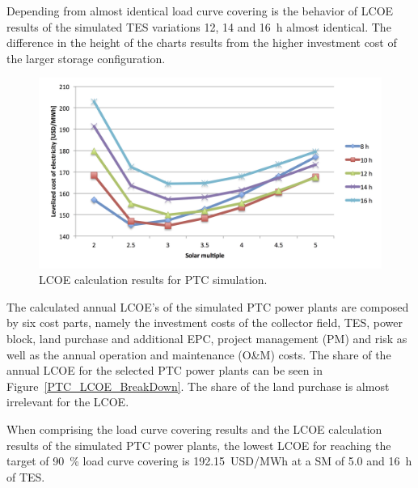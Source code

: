 Depending from almost identical load curve covering is the behavior of LCOE results of the simulated TES variations 12, 14 and 16~h almost identical. The difference in the height of the charts results from the higher investment cost of the larger storage configuration.

\begin{figure}[htbp]  
\centering
\includegraphics[width=1\linewidth]{FIG/PTC_LCOE}
\caption[LCOE calculation results for PTC simulation.]{LCOE calculation results for PTC simulation.}\label{PTC_LCOE}
\end{figure}
The calculated annual LCOE's of the simulated PTC power plants are composed by six cost parts, namely the investment costs of the collector field, TES, power block, land purchase and additional EPC, project management (PM) and risk as well as the annual operation and maintenance (O\&M) costs. The share of the annual LCOE for the selected PTC power plants can be seen in Figure~\ref{PTC_LCOE_BreakDown}. The share of the land purchase is almost irrelevant for the LCOE. 

When comprising the load curve covering results and the LCOE calculation results of the simulated PTC power plants, the lowest LCOE for reaching the target of 90~\% load curve covering is 192.15~USD/MWh at a SM of 5.0 and 16~h of TES. 

